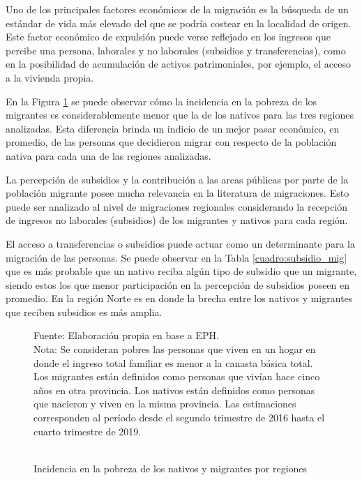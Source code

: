 \documentclass[12pt,a4paper]{article}
\begin{document}
Uno de los principales factores económicos de la migración es la búsqueda de un estándar de vida más elevado del que se podría costear en la localidad de origen. Este factor económico de expulsión puede verse reflejado en los ingresos que percibe una persona, laborales y no laborales (subsidios y transferencias), como en la posibilidad de acumulación de activos patrimoniales, por ejemplo, el acceso a la vivienda propia.

En la Figura \ref{figure:pobre_mig} se puede observar cómo la incidencia en la pobreza de los migrantes es considerablemente menor que la de los nativos para las tres regiones analizadas. Esta diferencia brinda un indicio de un mejor pasar económico, en promedio, de las personas que decidieron migrar con respecto de la población nativa para cada una de las regiones analizadas.

La percepción de subsidios y la contribución a las arcas públicas por parte de la población migrante posee mucha relevancia en la literatura de migraciones. Esto puede ser analizado al nivel de migraciones regionales considerando la recepción de ingresos no laborales (subsidios) de los migrantes y nativos para cada región. 

El acceso a transferencias o subsidios puede actuar como un determinante para la migración de las personas. Se puede observar en la Tabla \ref{cuadro:subsidio_mig} que es más probable que un nativo reciba algún tipo de subsidio que un migrante, siendo estos los que menor participación en la percepción de subsidios poseen en promedio. En la región Norte es en donde la brecha entre los nativos y migrantes que reciben subsidios es más amplia.

\newpage
\begin{figure}[ht!]
\begin{center}
\caption{\\Incidencia en la pobreza de los nativos y migrantes por regiones}
\label{figure:pobre_mig}
 
\end{center}
\begin{flushleft}
\begin{scriptsize}
Fuente: Elaboración propia en base a EPH.\\
Nota: Se consideran pobres las personas que viven en un hogar en donde el ingreso total familiar es menor a la canasta básica total. Los migrantes están definidos como personas que vivían hace cinco años en otra provincia. Los nativos están definidos como personas que nacieron y viven en la misma provincia. Las estimaciones corresponden al período desde el segundo trimestre de 2016 hasta el cuarto trimestre de 2019.\\
\end{scriptsize}
\end{flushleft}
\end{figure}
\end{document}
